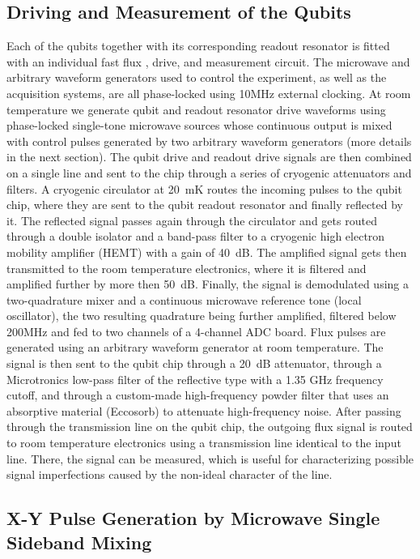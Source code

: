\subsection{Driving and Measurement of the Qubits}

Each of the qubits together with its corresponding readout resonator is fitted with an individual fast flux , drive, and measurement circuit. The microwave and arbitrary waveform generators used to control the experiment, as well as the acquisition systems, are all phase-locked using 10MHz external clocking.
At room temperature we generate qubit and readout resonator drive waveforms using phase-locked single-tone microwave sources whose continuous output is mixed with control pulses generated by two arbitrary waveform generators (more details in the next section). The qubit drive and readout drive signals are then combined on a single line and sent to the chip through a series of cryogenic attenuators and filters. A cryogenic circulator at 20~mK routes the incoming pulses to the qubit chip, where they are sent to the qubit readout resonator and finally reflected by it. The reflected signal passes again through the circulator and gets routed through a double isolator and a band-pass filter to a cryogenic high electron mobility amplifier (HEMT) with a gain of 40~dB. The amplified signal gets then transmitted to the room temperature electronics, where it is filtered and amplified further by more then 50~dB. Finally, the signal is demodulated using a two-quadrature mixer and a continuous microwave reference tone (local oscillator), the two resulting quadrature being further amplified, filtered below 200MHz and  fed to two channels of  a 4-channel ADC board. Flux pulses are generated using an arbitrary waveform generator at room temperature. The signal is then sent to the qubit chip through a 20~dB attenuator, through a Microtronics low-pass filter of the reflective type with a 1.35 GHz frequency cutoff, and through a custom-made high-frequency powder filter that uses an absorptive material (Eccosorb) to attenuate high-frequency noise. After passing through the transmission line on the qubit chip, the outgoing flux signal is routed to room temperature electronics using a transmission line identical to the input line. There, the signal can be measured, which is useful for characterizing possible signal imperfections caused by the non-ideal character of the line.

\subsection{X-Y Pulse Generation by Microwave Single Sideband Mixing}

